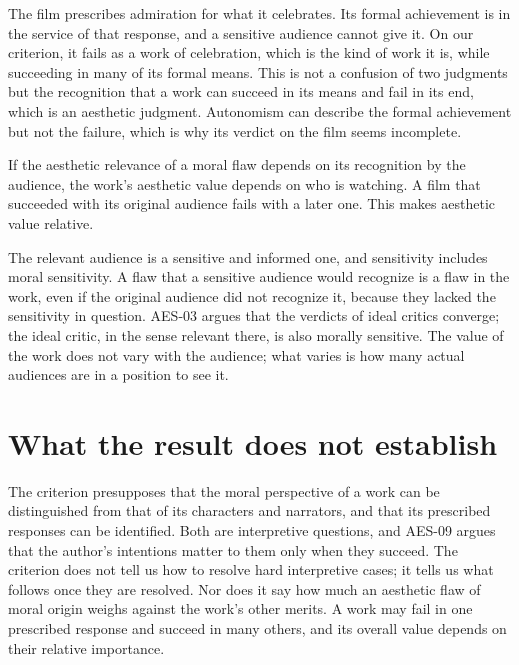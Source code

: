 \documentclass{situationist-preprint}
\begin{document}
\begin{reply}
The film prescribes admiration for what it celebrates. Its formal achievement is in the service of that response, and a sensitive audience cannot give it. On our criterion, it fails as a work of celebration, which is the kind of work it is, while succeeding in many of its formal means. This is not a confusion of two judgments but the recognition that a work can succeed in its means and fail in its end, which is an aesthetic judgment. Autonomism can describe the formal achievement but not the failure, which is why its verdict on the film seems incomplete.
\end{reply}

\begin{objection}
If the aesthetic relevance of a moral flaw depends on its recognition by the audience, the work's aesthetic value depends on who is watching. A film that succeeded with its original audience fails with a later one. This makes aesthetic value relative.
\end{objection}

\begin{reply}
The relevant audience is a sensitive and informed one, and sensitivity includes moral sensitivity. A flaw that a sensitive audience would recognize is a flaw in the work, even if the original audience did not recognize it, because they lacked the sensitivity in question. AES-03 argues that the verdicts of ideal critics converge; the ideal critic, in the sense relevant there, is also morally sensitive. The value of the work does not vary with the audience; what varies is how many actual audiences are in a position to see it.
\end{reply}

\section{What the result does not establish}

The criterion presupposes that the moral perspective of a work can be distinguished from that of its characters and narrators, and that its prescribed responses can be identified. Both are interpretive questions, and AES-09 argues that the author's intentions matter to them only when they succeed. The criterion does not tell us how to resolve hard interpretive cases; it tells us what follows once they are resolved. Nor does it say how much an aesthetic flaw of moral origin weighs against the work's other merits. A work may fail in one prescribed response and succeed in many others, and its overall value depends on their relative importance.
\end{document}
